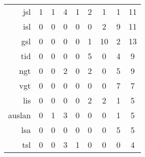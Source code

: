 \begin{table}[]
{\begin{tabular}{r|ccccccc|c}
        \acrshort{jsl}             & \cellcolor[HTML]{FFFEFB}1 & \cellcolor[HTML]{FFFEFB}1 & \cellcolor[HTML]{FFF9EE}4  & \cellcolor[HTML]{FFFEFB}1  & \cellcolor[HTML]{FFFCF6}2  & \cellcolor[HTML]{FFFEFB}1  & \cellcolor[HTML]{FFFEFB}1  & 11    \\
        \acrshort{isl}             & 0                         & 0                         & 0                          & 0                          & 0                          & \cellcolor[HTML]{FFFCF6}2  & \cellcolor[HTML]{FFF5E1}9  & 11    \\
        \acrshort{gsl}             & 0                         & 0                         & 0                          & 0                          & \cellcolor[HTML]{FFFEFB}1  & \cellcolor[HTML]{FFF1D4}10 & \cellcolor[HTML]{FFFCF6}2  & 13    \\
        \acrshort{tid}             & 0                         & 0                         & 0                          & 0                          & \cellcolor[HTML]{FFF8EA}5  & 0                          & \cellcolor[HTML]{FFF9EE}4  & 9     \\
        \acrshort{ngt}             & 0                         & 0                         & \cellcolor[HTML]{FFFCF6}2  & 0                          & \cellcolor[HTML]{FFFCF6}2  & 0                          & \cellcolor[HTML]{FFF8EA}5  & 9     \\
        \acrshort{vgt}             & 0                         & 0                         & 0                          & 0                          & 0                          & 0                          & \cellcolor[HTML]{FFF5E1}7  & 7     \\
        \acrshort{lis}             & 0                         & 0                         & 0                          & 0                          & \cellcolor[HTML]{FFFCF6}2  & \cellcolor[HTML]{FFFCF6}2  & \cellcolor[HTML]{FFFEFB}1  & 5     \\
        \acrshort{auslan}          & 0                         & \cellcolor[HTML]{FFFEFB}1 & \cellcolor[HTML]{FFFBF2}3  & 0                          & 0                          & 0                          & \cellcolor[HTML]{FFFEFB}1  & 5     \\
        \acrshort{lsa}             & 0                         & 0                         & 0                          & 0                          & 0                          & 0                          & \cellcolor[HTML]{FFF8EA}5  & 5     \\
        \acrshort{tsl}             & 0                         & 0                         & \cellcolor[HTML]{FFFBF2}3  & \cellcolor[HTML]{FFFEFB}1  & 0                          & 0                          & 0                          & 4     \\

\end{tabular}}
\end{table}
